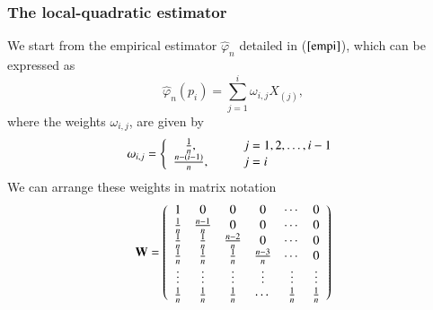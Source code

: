 \documentclass[preprint,12pt]{elsarticle}
\begin{document}
\subsubsection{The local-quadratic estimator}
\noindent We start from the empirical estimator $\widehat{\varphi}_n$ detailed in ($\ref{empi}$), which can be expressed as
\[
\widehat{\varphi}_n(p_i)=\sum_{j=1}^i\omega_{i,j} X_{(j)},
\] 
where the weights $\omega_{i,j}$, are given by 
\[
\omega_{i,j}=\left\{\begin{array}{cll}
\frac{1}{n}, & \hspace{0.3cm}& j= 1,2, \ldots, i-1 \\
\frac{n-(i-1)}{n},& \hspace{0.3cm}& j= i \\
\end{array}\right.
\]
We can arrange these weights in matrix notation
\[
{\bf W} =\left(
\begin{array}{cccccc}
1 & 0 &0 &0& \cdots &0 \\
\frac{1}{n} & \frac{n-1}{n}&0&0&\cdots& 0 \\
\frac{1}{n} & \frac{1}{n}&\frac{n-2}{n}&0&\cdots& 0 \\
\frac{1}{n} & \frac{1}{n}&\frac{1}{n}&\frac{n-3}{n}&\cdots& 0 \\
\vdots&\vdots&\vdots&\vdots&\vdots&\vdots \\
\frac{1}{n} & \frac{1}{n}&\frac{1}{n}&\cdots&\frac{1}{n}& \frac{1}{n} \\
\end{array}
\right)
\]
\end{document}
